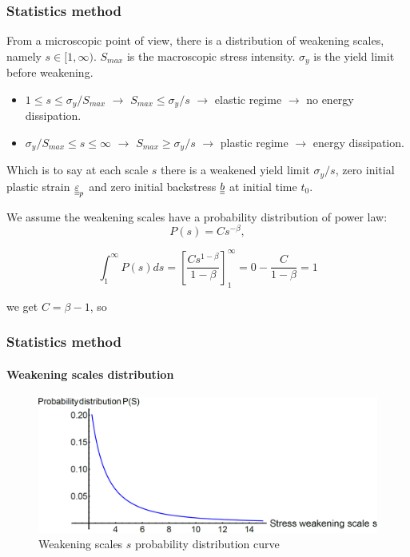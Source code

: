\documentclass[xcolor=table]{Bredelebeamer}
\begin{document}
\begin{frame}
	\frametitle{Statistics method}	
From a microscopic point of view, there is a distribution of weakening scales, namely $s\in[1,\infty)$. $S_{max}$ is the macroscopic stress intensity. $\sigma_y$ is the yield limit before weakening.
	
	\vspace{6pt}
	\begin{itemize}	
\item	$1\leqslant s\leqslant \sigma_y/S_{max}$ $\longrightarrow$ $S_{max}\leqslant \sigma_y/s$ $\longrightarrow$ elastic regime $\longrightarrow$ no energy dissipation.

\vspace{6pt}		
\item	$\sigma_y/S_{max}\leqslant s\leqslant \infty$ $\longrightarrow$ $S_{max}\geqslant \sigma_y/s$ $\longrightarrow$ plastic regime $\longrightarrow$  energy dissipation.
\end{itemize}
	\vspace{6pt}
Which is to say at each scale $s$ there is a weakened yield limit $\sigma_y/s$, zero initial plastic strain $\uline{\uline{\varepsilon}}_p$ and zero initial backstress $\uline{\uline{b}}$ at initial time $t_0$.

	\vspace{6pt}
	We assume the weakening scales have a probability distribution of power law: 
	$$P(s) = Cs^{-\beta},$$
	
	$$\int_{1}^{\infty}P(s)ds=\left[ \frac{Cs^{1-\beta}}{1-\beta}\right] _{1}^{\infty}=0-\frac{C}{1-\beta}=1$$
	
	we get $C=\beta-1$, so 
\end{frame}	



\begin{frame}
	\frametitle{Statistics method}	
	\framesubtitle{Weakening scales distribution}	
	
	\begin{figure}[h!]
		\centering
		\includegraphics[width=\textwidth]{figures//ps.png} 
		\caption{Weakening scales $s$ probability distribution curve}
		\label{ps}
	\end{figure}
\end{frame}	
\end{document}
